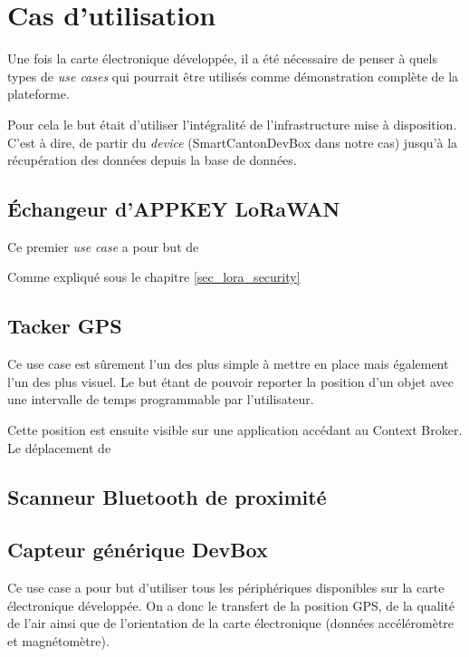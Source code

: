 \chapter{Cas d'utilisation}

Une fois la carte électronique développée, il a été nécessaire de penser à quels types de \textit{use cases} qui pourrait être utilisés comme démonstration complète de la plateforme.

Pour cela le but était d'utiliser l'intégralité de l'infrastructure mise à disposition. C'est à dire, de partir du \textit{device} (SmartCantonDevBox dans notre cas) jusqu'à la récupération des données depuis la base de données.

\section{Échangeur d'APPKEY LoRaWAN}

Ce premier \textit{use case} a pour but de 

Comme expliqué sous le chapitre \ref{sec_lora_security}



\section{Tacker GPS}

Ce use case est sûrement l'un des plus simple à mettre en place mais également l'un des plus visuel. Le but étant de pouvoir reporter la position d'un objet avec une intervalle de temps programmable par l'utilisateur.

Cette position est ensuite visible sur une application accédant au Context Broker. Le déplacement de 

\section{Scanneur Bluetooth de proximité}






\section{Capteur générique DevBox}

Ce use case a pour but d'utiliser tous les périphériques disponibles sur la carte électronique développée. On a donc le transfert de la position GPS, de la qualité de l'air ainsi que de l'orientation de la carte électronique (données accéléromètre et magnétomètre).

